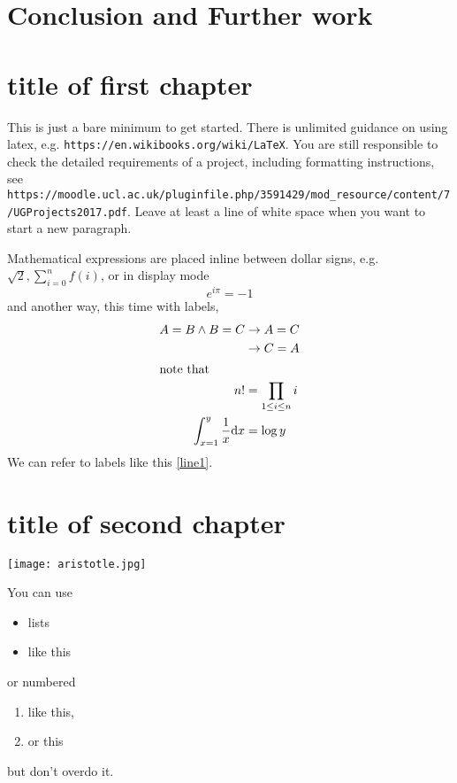 \documentclass{report}
\numberwithin{equation}{section}
\numberwithin{figure}{section}
\numberwithin{table}{section}
\begin{document}
\chapter{Conclusion and Further work}


\chapter{title of first chapter}
This is just a bare minimum to get started.  There is unlimited guidance on using latex, e.g. {\tt https://en.wikibooks.org/wiki/LaTeX}.   You are still responsible to check the detailed requirements of a project, including formatting instructions, see \\
{\tt https://moodle.ucl.ac.uk/pluginfile.php/3591429/mod\_resource/content/7/UGProjects2017.pdf}.
Leave at least a line of white space when you want to start a new paragraph.

Mathematical expressions are placed inline between dollar signs, e.g. $\sqrt 2, \sum_{i=0}^nf(i)$, or in display mode
\[ e^{i\pi}=-1\] and another way, this time with labels,
\begin{align}
\label{line1} A=B\wedge B=C&\rightarrow A=C\\
&\rightarrow C=A\\
\intertext{note that}
n!&=\prod_{1\leq i\leq n}i \\
\int_{x=1}^y \frac 1 x \mathrm{d}x&=\log y
\end{align}
We can refer to labels like this \eqref{line1}.   

\chapter{title of second chapter}

\begin{center}
\texttt{[image: aristotle.jpg]}
\end{center}
You can use 
\begin{itemize}
\item lists
\item like this
\end{itemize}
or numbered
\begin{enumerate}
\item like this,
\item or this
\end{enumerate}
but don't overdo it.
\end{document}
